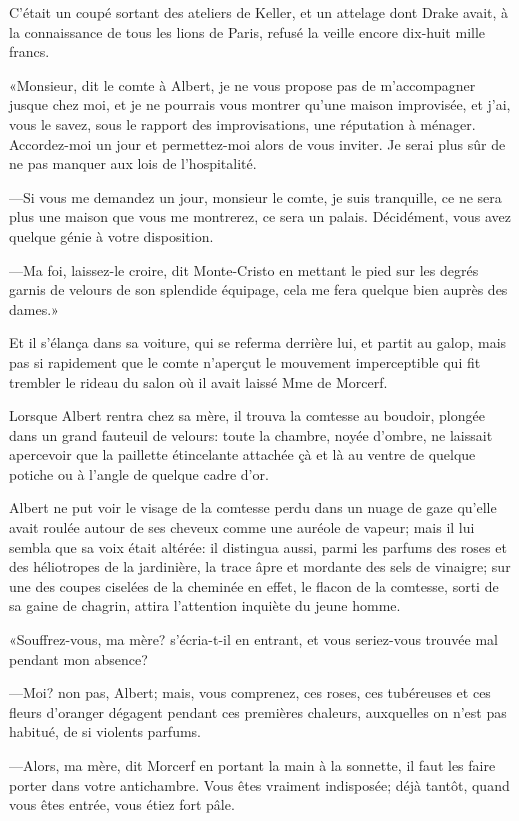 C'était un coupé sortant des ateliers de Keller, et un attelage dont Drake avait, à la connaissance de tous les lions de Paris, refusé la veille encore dix-huit mille francs. 

«Monsieur, dit le comte à Albert, je ne vous propose pas de m'accompagner jusque chez moi, et je ne pourrais vous montrer qu'une maison improvisée, et j'ai, vous le savez, sous le rapport des improvisations, une réputation à ménager. Accordez-moi un jour et permettez-moi alors de vous inviter. Je serai plus sûr de ne pas manquer aux lois de l'hospitalité. 

—Si vous me demandez un jour, monsieur le comte, je suis tranquille, ce ne sera plus une maison que vous me montrerez, ce sera un palais. Décidément, vous avez quelque génie à votre disposition. 

—Ma foi, laissez-le croire, dit Monte-Cristo en mettant le pied sur les degrés garnis de velours de son splendide équipage, cela me fera quelque bien auprès des dames.» 

Et il s'élança dans sa voiture, qui se referma derrière lui, et partit au galop, mais pas si rapidement que le comte n'aperçut le mouvement imperceptible qui fit trembler le rideau du salon où il avait laissé Mme de Morcerf. 

Lorsque Albert rentra chez sa mère, il trouva la comtesse au boudoir, plongée dans un grand fauteuil de velours: toute la chambre, noyée d'ombre, ne laissait apercevoir que la paillette étincelante attachée çà et là au ventre de quelque potiche ou à l'angle de quelque cadre d'or. 

Albert ne put voir le visage de la comtesse perdu dans un nuage de gaze qu'elle avait roulée autour de ses cheveux comme une auréole de vapeur; mais il lui sembla que sa voix était altérée: il distingua aussi, parmi les parfums des roses et des héliotropes de la jardinière, la trace âpre et mordante des sels de vinaigre; sur une des coupes ciselées de la cheminée en effet, le flacon de la comtesse, sorti de sa gaine de chagrin, attira l'attention inquiète du jeune homme. 

«Souffrez-vous, ma mère? s'écria-t-il en entrant, et vous seriez-vous trouvée mal pendant mon absence? 

—Moi? non pas, Albert; mais, vous comprenez, ces roses, ces tubéreuses et ces fleurs d'oranger dégagent pendant ces premières chaleurs, auxquelles on n'est pas habitué, de si violents parfums. 

—Alors, ma mère, dit Morcerf en portant la main à la sonnette, il faut les faire porter dans votre antichambre. Vous êtes vraiment indisposée; déjà tantôt, quand vous êtes entrée, vous étiez fort pâle. 

